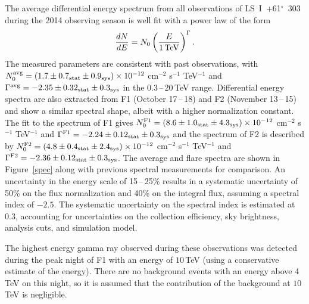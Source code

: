 \documentclass[preprint2]{aastex}
\newcommand{\tapp}{\raisebox{0.5ex}{\texttildelow}}
\newcommand{\pflux}{~photons cm$^{-2}$ s$^{-1}$}
\newcommand{\lsi}{LS~I~+61$^{\circ}$~303}
\newcommand{\tev}{\,TeV}
\begin{document}

The average differential energy spectrum from all observations of \lsi{} during the 2014 observing season is well fit with a power law of the form
\begin{equation}
\frac{dN}{dE} = N_0 \left( \frac{E}{1\mbox{\tev{}}} \right)^{\Gamma}.
\end{equation}
The measured parameters are consistent with past observations, with $N_0^{\mbox{\scriptsize avg}} = \left( 1.7 \pm 0.7_{\mathrm{stat}} \pm 0.9_{\mathrm{sys}} \right) \times 10^{-12}$ cm$^{-2}$ s$^{-1}$ TeV$^{-1}$ and $\Gamma^{\mbox{\scriptsize avg}} = -2.35 \pm 0.32_{\mathrm{stat}} \pm 0.3_{\mathrm{sys}}$ in the 0.3\,--\,20\tev{} range. Differential energy spectra are also extracted from F1 (October 17\,--\,18)  and F2 (November 13\,--\,15) and show a similar spectral shape, albeit with a higher normalization constant. The fit to the spectrum of F1 gives $N_0^{\mbox{\scriptsize F1}} = \left( 8.6 \pm 1.0_{\mathrm{stat}} \pm 4.3_{\mathrm{sys}} \right) \times 10^{-12}$ cm$^{-2}$ s$^{-1}$ TeV$^{-1}$ and $\Gamma^{\mbox{\scriptsize F1}} = -2.24 \pm 0.12_{\mathrm{stat}} \pm 0.3_{\mathrm{sys}}$  and the spectrum of F2 is described by $N_0^{\mbox{\scriptsize F2}} = \left( 4.8 \pm 0.4_{\mathrm{stat}} \pm 2.4_{\mathrm{sys}} \right) \times 10^{-12}$ cm$^{-2}$ s$^{-1}$ TeV$^{-1}$ and $\Gamma^{\mbox{\scriptsize F2}} = -2.36 \pm 0.12_{\mathrm{stat}} \pm 0.3_{\mathrm{sys}}$. The average and flare spectra are shown in Figure~\ref{spec} along with previous spectral measurements for comparison. An uncertainty in the energy scale of 15\,--\,25\% results in a systematic uncertainty of \tapp{}50\% on the flux normalization and \tapp{}40\% on the integral flux, assuming a spectral index of $-2.5$. The systematic uncertainty on the spectral index is estimated at \tapp{}0.3, accounting for uncertainties on the collection efficiency, sky brightness, analysis cuts, and simulation model.

The highest energy gamma ray observed during these observations was detected during the peak night of F1 with an energy of \tapp{}$10$\tev{} (using a conservative estimate of the energy). There are no background events with an energy above 4\tev{} on this night, so it is assumed that the contribution of the background at \tapp{}$10$\tev{} is negligible.
\end{document}
